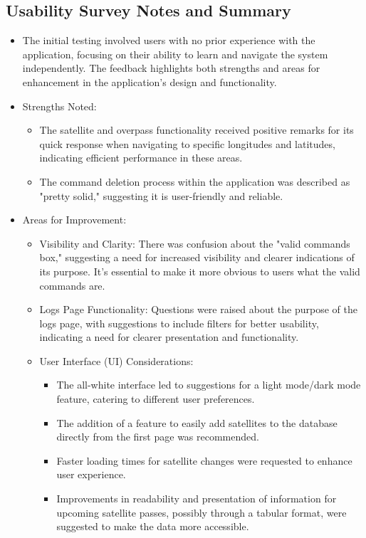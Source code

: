 \documentclass[12pt, titlepage]{article}
\begin{document}
\subsection{Usability Survey Notes and Summary}
\begin{itemize}
    \item The initial testing involved users with no prior experience with the application, focusing on their ability to learn and navigate the system independently. The feedback highlights both strengths and areas for enhancement in the application's design and functionality.
    \item Strengths Noted:
    \begin{itemize}
        \item The satellite and overpass functionality received positive remarks for its quick response when navigating to specific longitudes and latitudes, indicating efficient performance in these areas.
        \item The command deletion process within the application was described as "pretty solid," suggesting it is user-friendly and reliable.
    \end{itemize}
    \item Areas for Improvement:
    \begin{itemize}
        \item Visibility and Clarity: There was confusion about the "valid commands box," suggesting a need for increased visibility and clearer indications of its purpose. It's essential to make it more obvious to users what the valid commands are.
        \item Logs Page Functionality: Questions were raised about the purpose of the logs page, with suggestions to include filters for better usability, indicating a need for clearer presentation and functionality.
        \item User Interface (UI) Considerations:
        \begin{itemize}
            \item The all-white interface led to suggestions for a light mode/dark mode feature, catering to different user preferences.
            \item The addition of a feature to easily add satellites to the database directly from the first page was recommended.
            \item Faster loading times for satellite changes were requested to enhance user experience.
            \item Improvements in readability and presentation of information for upcoming satellite passes, possibly through a tabular format, were suggested to make the data more accessible.

\end{itemize}
\end{itemize}
\end{itemize}
\end{document}
